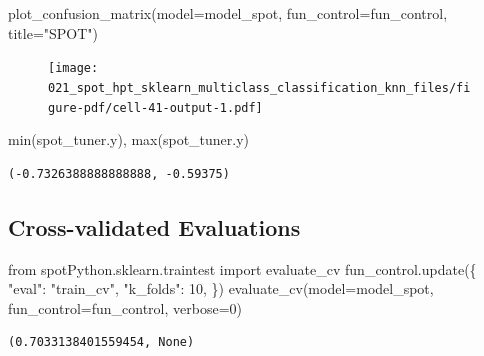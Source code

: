 \documentclass[
  letterpaper,
  DIV=11,
  numbers=noendperiod]{scrreprt}
\newenvironment{Shaded}{\begin{snugshade}}{\end{snugshade}}
\newcommand{\BuiltInTok}[1]{\textcolor[rgb]{0.00,0.23,0.31}{#1}}
\newcommand{\DecValTok}[1]{\textcolor[rgb]{0.68,0.00,0.00}{#1}}
\newcommand{\ImportTok}[1]{\textcolor[rgb]{0.00,0.46,0.62}{#1}}
\newcommand{\NormalTok}[1]{\textcolor[rgb]{0.00,0.23,0.31}{#1}}
\newcommand{\OperatorTok}[1]{\textcolor[rgb]{0.37,0.37,0.37}{#1}}
\newcommand{\StringTok}[1]{\textcolor[rgb]{0.13,0.47,0.30}{#1}}
\begin{document}
\begin{Shaded}
\begin{Highlighting}[]
\NormalTok{plot\_confusion\_matrix(model}\OperatorTok{=}\NormalTok{model\_spot, fun\_control}\OperatorTok{=}\NormalTok{fun\_control, title}\OperatorTok{=}\StringTok{"SPOT"}\NormalTok{)}
\end{Highlighting}
\end{Shaded}

\begin{figure}[H]

{\centering \texttt{[image: 021\_spot\_hpt\_sklearn\_multiclass\_classification\_knn\_files/figure-pdf/cell-41-output-1.pdf]}

}

\end{figure}

\begin{Shaded}
\begin{Highlighting}[]
\BuiltInTok{min}\NormalTok{(spot\_tuner.y), }\BuiltInTok{max}\NormalTok{(spot\_tuner.y)}
\end{Highlighting}
\end{Shaded}

\begin{verbatim}
(-0.7326388888888888, -0.59375)
\end{verbatim}

\hypertarget{cross-validated-evaluations-3}{%
\subsection{Cross-validated
Evaluations}\label{cross-validated-evaluations-3}}

\begin{Shaded}
\begin{Highlighting}[]
\ImportTok{from}\NormalTok{ spotPython.sklearn.traintest }\ImportTok{import}\NormalTok{ evaluate\_cv}
\NormalTok{fun\_control.update(\{}
     \StringTok{"eval"}\NormalTok{: }\StringTok{"train\_cv"}\NormalTok{,}
     \StringTok{"k\_folds"}\NormalTok{: }\DecValTok{10}\NormalTok{,}
\NormalTok{\})}
\NormalTok{evaluate\_cv(model}\OperatorTok{=}\NormalTok{model\_spot, fun\_control}\OperatorTok{=}\NormalTok{fun\_control, verbose}\OperatorTok{=}\DecValTok{0}\NormalTok{)}
\end{Highlighting}
\end{Shaded}

\begin{verbatim}
(0.7033138401559454, None)
\end{verbatim}
\end{document}
